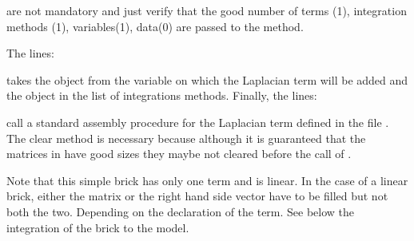 \documentclass[a4paper,11pt,english]{sphinxmanual}
\begin{document}
are not mandatory and just verify that the good number of terms (1), integration
methods (1), variables(1), data(0) are passed to the 
method.

The lines:

\begin{sphinxVerbatim}[commandchars=\\\{\}]
    \PYG{p}{[}\PYG{p}{]}
    \PYG{p}{[}\PYG{p}{]}
\end{sphinxVerbatim}

takes the  object from the variable on which the Laplacian term will be added
and the  object in the list of integrations methods. Finally, the lines:

\begin{sphinxVerbatim}[commandchars=\\\{\}]
\PYG{p}{[}\PYG{p}{]}
\PYG{p}{[}\PYG{p}{]}   
\end{sphinxVerbatim}

call a standard assembly procedure for the Laplacian term defined in the file
. The clear method is necessary because
although it is guaranteed that the matrices in  have good sizes they
maybe not cleared before the call of .

Note that this simple brick has only one term and is linear. In the case of a
linear brick, either the matrix or the right hand side vector have to be filled
but not both the two. Depending on the declaration of the term. See below the
integration of the brick to the model.
\end{document}
